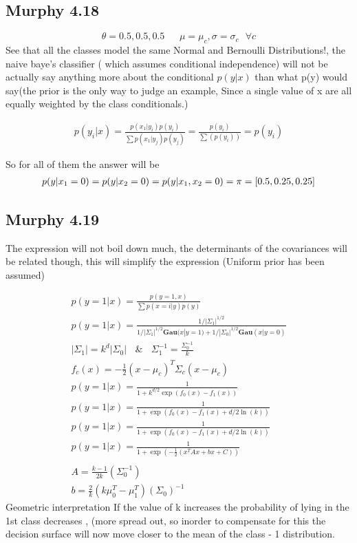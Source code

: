 \subsection{Murphy 4.18}
 $$\theta = 0.5, 0.5 , 0.5 \ \ \ \ \ \ \ \mu  = \mu_c , \sigma  = \sigma_c   \ \ \ \forall c $$
See that all the classes model the same Normal and Bernoulli Distributions!, the naive baye's classifier ( which assumes conditional independence) will not be actually say anything more about the conditional $p(y|x)$ than what p(y) would say(the prior is the only way to judge an example, 
Since a single value of x are all equally weighted by the class conditionals.)

\begin{gather}
    p(y_i|x) =  \frac{p(x_1|y_i)p(y_i)}{\sum p(x_1|y_j)p(y_j)} = \frac{p(y_i)}{\sum(p(y_i))} = p(y_i)
\end{gather}

So for all of them the answer will be
\begin{gather}
    p(y |x_1 = 0) = p(y | x_2 = 0) = p(y | x_1,x_2 = 0) =  \vb{\pi} = [0.5, 0.25, 0.25]
\end{gather}
\subsection{Murphy 4.19}
The expression will not boil down much, the determinants of the covariances will be related though, this will simplify the expression (Uniform prior has been assumed)

\begin{gather*}
    p(y = 1| x)  = \frac{p(y = 1, x)}{\sum p(x = i | y)p(y)}
    \\
    p(y = 1| x)  = \frac{1/|\Sigma_1|^{1/2}}{1/|\Sigma_1|^{1/2}\textbf{Gau}(x|y=1) + 1/|\Sigma_0|^{1/2}\textbf{Gau}(x|y = 0) }
    \\
    |\Sigma_1| = k^d |\Sigma_0 | \ \ \ \ \& \ \ \ \  \Sigma_1^{-1} = \frac{\Sigma_0^{-1} }{k}
    \\
     f_c(x) = -\frac{1}{2}(x - \mu_c)^T\Sigma_c(x - \mu_c)
     \\
    p(y = 1 | x) = \frac{1}{1 + k^{d/2}\exp(f_0(x) - f_1(x))}
    \\
    p(y = 1 | x) = \frac{1}{1 + \exp(f_0(x) - f_1(x) + d/2 \ln(k))}
    \\
     p(y = 1 | x) = \frac{1}{1 + \exp(f_0(x) - f_1(x) + d/2 \ln(k))}
     \\
     p(y = 1 | x) = \frac{1}{1 + \exp(-\frac{1}{2}( x^TAx + bx + C))} \\
     \\
     A = \frac{k - 1}{2k} (\Sigma_0^{-1})
     \\
     b = \frac{2}{k}(k\mu_0^T  - \mu_1^T)(\Sigma_0)^{-1}
\end{gather*}
Geometric interpretation
If the value of k increases the probability of lying in the 1st class decreases , (more spread out, so inorder to  compensate for this the decision surface will now move closer to the mean of the class - 1 distribution.

